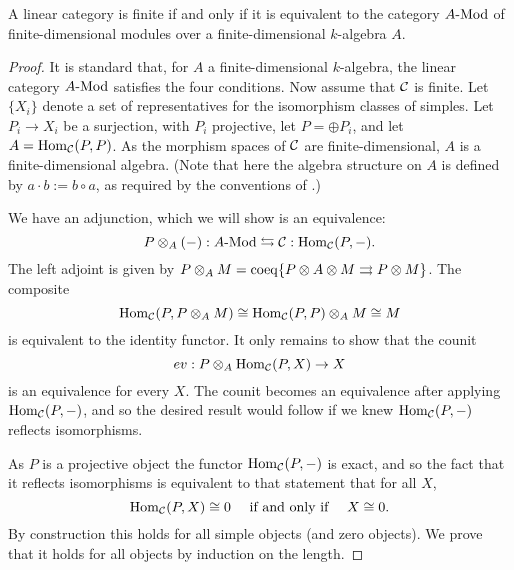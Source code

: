 \documentclass{amsart}
\begin{document}
\begin{proposition}
A linear category is finite if and only if it is equivalent to the category $\Mod{A}{}$ of finite-dimensional modules over a finite-dimensional $k$-algebra $A$.
\end{proposition}
\begin{proof}
	It is standard that, for $A$ a finite-dimensional $k$-algebra, the linear category $\Mod{A}{}$ satisfies the four conditions. 
	Now assume that $\mathcal C$ is finite. Let $\{X_i\}$ denote a set of representatives for the isomorphism classes of simples. Let $P_i \to X_i$ be a surjection, with $P_i$ projective, let $P = \oplus P_i$, and let $A = \operatorname{Hom}_{\mathcal C}(P,P)$. As the morphism spaces of $\mathcal C$ are finite-dimensional, $A$ is a finite-dimensional algebra.  (Note that here the algebra structure on $A$ is defined by $a \cdot b := b \circ a$, as required by the conventions of \cite{DTCI}.)
	
We have an adjunction, which we will show is an equivalence:
	\begin{equation*}
		P \otimes_A (-):\Mod{A}{} \leftrightarrows \cC: \Hom_{\cC}(P,-).
	\end{equation*}
	The left adjoint is given by $P \otimes_A M = \operatorname{coeq}\{ P \otimes A \otimes M \rightrightarrows P \otimes M\}$. 
The composite 
\begin{equation*}
	\operatorname{Hom}_{\mathcal C}(P, P \otimes_A M) \cong \operatorname{Hom}_{\mathcal C}(P, P) \otimes_A M \cong M
\end{equation*}
 is equivalent to the identity functor. It only remains to show that the counit 
\begin{equation*}
	ev:P \otimes_A \operatorname{Hom}_{\mathcal C}(P, X) \to X
\end{equation*}
is an equivalence for every $X$. The counit becomes an equivalence after applying $\operatorname{Hom}_{\mathcal C}(P,-)$, and so the desired result would follow if we knew $\operatorname{Hom}_{\mathcal C}(P,-)$ reflects isomorphisms. 

As $P$ is a projective object the functor $\operatorname{Hom}_{\mathcal C}(P,-)$ is exact, and so the fact that it reflects isomorphisms is equivalent to that statement that for all $X$, 
\begin{equation*}
	\operatorname{Hom}_{\mathcal C}(P,X) \cong 0 \quad \textrm{ if and only if } \quad X \cong 0.
\end{equation*} 
By construction this holds for all simple objects (and zero objects). We prove that it holds for all objects by induction on the length. 


\end{proof}
\end{document}
